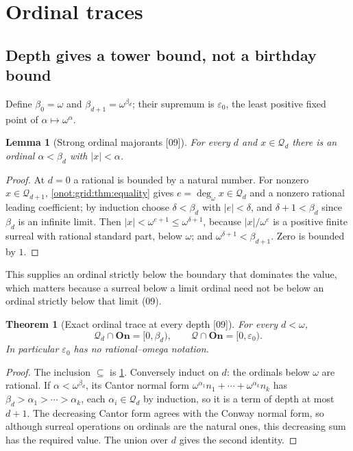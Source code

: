 \documentclass[11pt,oneside]{article}
\numberwithin{equation}{section}
\newtheorem{theorem}{Theorem}[section]
\newtheorem{lemma}[lemma]{Lemma}
\theoremstyle{definition}
\theoremstyle{remark}
\newcommand{\On}{\mathbf{On}}
\newcommand{\QO}{\mathcal Q}
\newcommand{\ddeg}{\operatorname{deg}_{\omega}}
\newcommand{\src}[1]{\textup{\textsf{\small[#1]}}}
\begin{document}
\section{Ordinal traces}\label{onot:grid:sec:ordinals}

\subsection{Depth gives a tower bound, not a birthday bound}

Define $\beta_0=\omega$ and $\beta_{d+1}=\omega^{\beta_d}$; their supremum is
$\varepsilon_0$, the least positive fixed point of $\alpha\mapsto\omega^\alpha$.

\begin{lemma}[Strong ordinal majorants \src{09}]\label{onot:grid:lem:majorants}
For every $d$ and $x\in\QO_d$ there is an ordinal $\alpha<\beta_d$ with
$|x|<\alpha$.
\end{lemma}
\begin{proof}
At $d=0$ a rational is bounded by a natural number. For nonzero
$x\in\QO_{d+1}$, \cref{onot:grid:thm:equality} gives $e=\ddeg x\in\QO_d$ and a
nonzero rational leading coefficient; by induction choose $\delta<\beta_d$ with
$|e|<\delta$, and $\delta+1<\beta_d$ since $\beta_d$ is an infinite limit. Then
$|x|<\omega^{e+1}\le\omega^{\delta+1}$, because $|x|/\omega^e$ is a positive
finite surreal with rational standard part, below $\omega$; and
$\omega^{\delta+1}<\beta_{d+1}$. Zero is bounded by $1$.
\end{proof}
This supplies an ordinal strictly below the boundary that dominates the value,
which matters because a surreal below a limit ordinal need not be below an
ordinal strictly below that limit (09).

\begin{theorem}[Exact ordinal trace at every depth \src{09}]\label{onot:grid:thm:ordinaltrace}
For every $d<\omega$,
\begin{equation}\label{onot:grid:eq:ordinaltrace}
 \QO_d\cap\On=[0,\beta_d),\qquad \QO\cap\On=[0,\varepsilon_0).
\end{equation}
In particular $\varepsilon_0$ has no rational--omega notation.
\end{theorem}
\begin{proof}
The inclusion $\subseteq$ is \cref{onot:grid:lem:majorants}. Conversely induct on
$d$: the ordinals below $\omega$ are rational. If $\alpha<\omega^{\beta_d}$, its
Cantor normal form $\omega^{\alpha_1}n_1+\cdots+\omega^{\alpha_k}n_k$ has
$\beta_d>\alpha_1>\cdots>\alpha_k$, each $\alpha_i\in\QO_d$ by induction, so it is
a term of depth at most $d+1$. The decreasing Cantor form agrees with the Conway
normal form, so although surreal operations on ordinals are the natural ones, this
decreasing sum has the required value. The union over $d$ gives the second
identity.
\end{proof}
\end{document}
